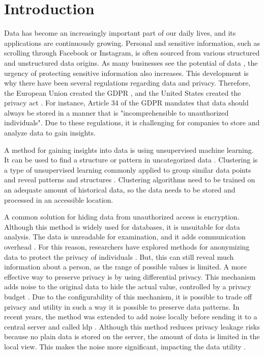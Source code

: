 \chapter{Introduction} \label{chapter:introduction}
Data has become an increasingly important part of our daily lives, and its applications are continuously growing.
Personal and sensitive information, such as scrolling through Facebook or Instagram, is often sourced from various structured and unstructured data origins.
As many businesses see the potential of data \citep{noauthor_global_nodate}, the urgency of protecting sensitive information also increases.
This development is why there have been several regulations regarding data and privacy.
Therefore, the European Union created the GDPR \citep{noauthor_eur-lex_nodate}, and the United States created the privacy act \citep{division_privacy_2007}.
For instance, Article 34 of the GDPR mandates that data should always be stored in a manner that is "incomprehensible to unauthorized individuals".
Due to these regulations, it is challenging for companies to store and analyze data to gain insights.

A method for gaining insights into data is using unsupervised machine learning.
It can be used to find a structure or pattern in uncategorized data \citep{dridi_unsupervised_2021}.
Clustering is a type of unsupervised learning commonly applied to group similar data points and reveal patterns and structures \citep{dridi_unsupervised_2021}.
Clustering algorithms need to be trained on an adequate amount of historical data, so the data needs to be stored and processed in an accessible location.

A common solution for hiding data from unauthorized access is encryption.
Although this method is widely used for databases, it is unsuitable for data analysis.
The data is unreadable for examination, and it adds communication overhead \citep{liu_when_2022}.
For this reason, researchers have explored methods for anonymizing data to protect the privacy of individuals \citep{sweeney_k-anonymity_2002}.
But, this can still reveal much information about a person, as the range of possible values is limited.
A more effective way to preserve privacy is by using differential privacy.
This mechanism adds noise to the original data to hide the actual value, controlled by a privacy budget \citep{dwork_differential_2006}.
Due to the configurability of this mechanism, it is possible to trade off privacy and utility in such a way it is possible to preserve data patterns.
In recent years, the method was extended to add noise locally before sending it to a central server and called \gls{ldp} \citep{kasiviswanathan_what_2010}.
Although this method reduces privacy leakage risks because no plain data is stored on the server, the amount of data is limited in the local view.
This makes the noise more significant, impacting the data utility \citep{yang_local_2020}.

